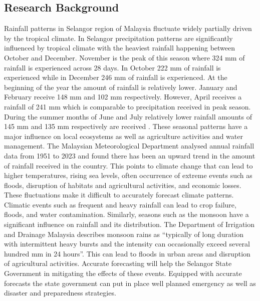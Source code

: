 \documentclass{article}
\begin{document}
\subsection{Research Background}
Rainfall patterns in Selangor region of Malaysia fluctuate widely partially driven by the
tropical climate. In Selangor precipitation patterns are significantly influenced by tropical
climate with the heaviest rainfall happening between October and December. November is the
peak of this season where 324 mm of rainfall is experienced across 28 days. In October 222
mm of rainfall is experienced while in December 246 mm of rainfall is experienced. At the
beginning of the year the amount of rainfall is relatively lower. January and February receive
148 mm and 102 mm respectively. However, April receives a rainfall of 241 mm which is
comparable to precipitation received in peak season. During the summer months of June and
July relatively lower rainfall amounts of 145 mm and 135 mm respectively are received
\cite{nomadseason_2025}. These seasonal patterns have a major influence on local ecosystems as
well as agriculture activities and water management. The Malaysian Meteorological
Department \cite{malaysian_meteorological_department_2025} analysed annual rainfall data from 1951 to 2023 and found there has been
an upward trend in the amount of rainfall received in the country. This points to climate change
that can lead to higher temperatures, rising sea levels, often occurrence of extreme events such
as floods, disruption of habitats and agricultural activities, and economic losses. These
fluctuations make it difficult to accurately forecast climate patterns. Climatic events such as
frequent and heavy rainfall can lead to crop failure, floods, and water contamination. Similarly,
seasons such as the monsoon have a significant influence on rainfall and its distribution. The
Department of Irrigation and Drainage Malaysia \cite{department_of_irrigation_and_drainage_malaysia_2025} describes monsoon rains as “typically
of long duration with intermittent heavy bursts and the intensity can occasionally exceed
several hundred mm in 24 hours”. This can lead to floods in urban areas and disruption of
agricultural activities. Accurate forecasting will help the Selangor State Government in
mitigating the effects of these events. Equipped with accurate forecasts the state government
can put in place well planned emergency as well as disaster and preparedness strategies.
\end{document}
